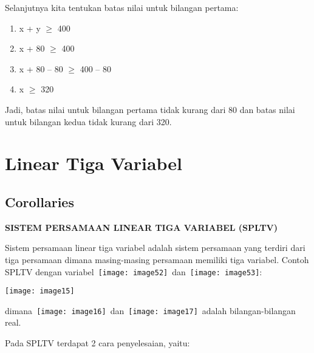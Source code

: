 \documentclass[11pt,fleqn]{book} %
\begin{document}
\noindent Selanjutnya kita tentukan batas nilai untuk bilangan pertama:

\begin{enumerate}
\item  x + y $\mathrm{\ge}$ 400

\item  x + 80 $\mathrm{\ge}$ 400

\item  x + 80 -- 80 $\mathrm{\ge}$ 400 -- 80 

\item  x $\mathrm{\ge}$ 320
\end{enumerate}

\noindent Jadi, batas nilai untuk bilangan pertama tidak kurang dari 80 dan batas nilai untuk bilangan kedua tidak kurang dari 320.



\chapter{Linear Tiga Variabel}

\section{Corollaries}

\noindent \textbf{SISTEM PERSAMAAN LINEAR TIGA VARIABEL (SPLTV)}

\noindent Sistem persamaan linear tiga variabel adalah sistem persamaan yang terdiri dari tiga persamaan dimana masing-masing persamaan memiliki tiga variabel. Contoh SPLTV dengan variabel~\texttt{[image: image52]}~dan~\texttt{[image: image53]}:

\noindent \texttt{[image: image15]}

\noindent dimana~\texttt{[image: image16]}~dan~\texttt{[image: image17]}~adalah bilangan-bilangan real.

\noindent Pada SPLTV terdapat 2 cara penyelesaian, yaitu:
\end{document}
